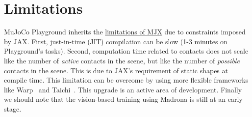 \section{Limitations}

MuJoCo Playground inherits the \href{https://mujoco.readthedocs.io/en/stable/mjx.html#mjx-the-sharp-bits}{limitations of MJX} due to constraints imposed by JAX. First, just-in-time (JIT) compilation can be slow (1-3 minutes on Playground's tasks). Second, computation time related to contacts does not scale like the number of \emph{active} contacts in the scene, but like the number of \emph{possible} contacts in the scene. This is due to JAX's requirement of static shapes at compile time. This limitation can be overcome by using more flexible frameworks like Warp~\cite{macklin2022warp} and Taichi~\cite{Genesis}. This upgrade is an active area of development. Finally we should note that the vision-based training using Madrona is still at an early stage.
